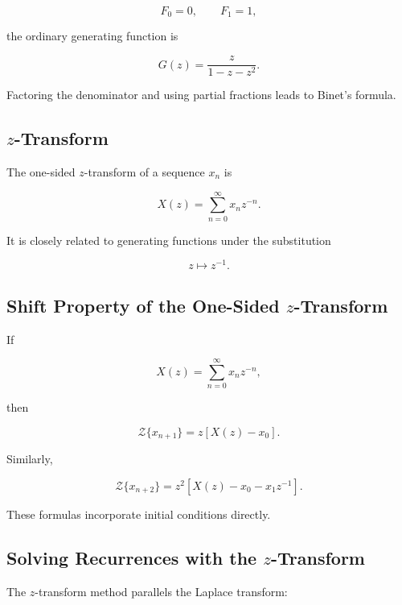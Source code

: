 \[
F_0=0,
\qquad
F_1=1,
\]

the ordinary generating function is

\[
\boxed{
G(z)
=
\frac{
z
}{
1-z-z^2
}.
}
\]

Factoring the denominator and using partial fractions leads to Binet's
formula.

\subsection{\(z\)-Transform}
\label{subsec:z-transform-difference-equations}

The one-sided \(z\)-transform of a sequence \(x_n\) is

\[
\boxed{
X(z)
=
\sum_{n=0}^{\infty}
x_nz^{-n}.
}
\]

It is closely related to generating functions under the substitution

\[
z\mapsto z^{-1}.
\]

\subsection{Shift Property of the One-Sided \(z\)-Transform}
\label{subsec:z-transform-shift-property}

If

\[
X(z)
=
\sum_{n=0}^{\infty}
x_nz^{-n},
\]

then

\[
\boxed{
\mathcal{Z}\{x_{n+1}\}
=
z
[
X(z)-x_0
].
}
\]

Similarly,

\[
\boxed{
\mathcal{Z}\{x_{n+2}\}
=
z^2
\left[
X(z)-x_0-x_1z^{-1}
\right].
}
\]

These formulas incorporate initial conditions directly.

\subsection{Solving Recurrences with the \(z\)-Transform}
\label{subsec:solving-recurrences-z-transform}

The \(z\)-transform method parallels the Laplace transform:

